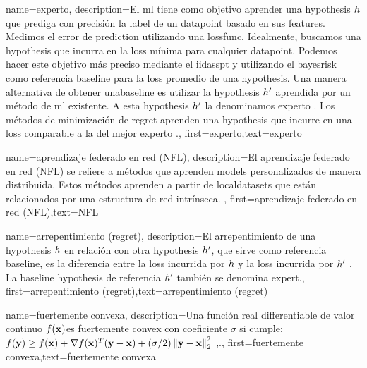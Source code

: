 {name={experto},
	description={El \gls{ml} tiene como objetivo aprender una \gls{hypothesis} $h$ que prediga con precisión la \gls{label} 
		de un \gls{datapoint} basado en sus \gls{feature}s. Medimos el error de \gls{prediction} utilizando una
		\gls{lossfunc}. Idealmente, buscamos una \gls{hypothesis} que incurra en la \gls{loss} mínima
		para cualquier \gls{datapoint}. Podemos hacer este objetivo más preciso mediante el \gls{iidasspt} 
		y utilizando el \gls{bayesrisk} como referencia \gls{baseline} para la \gls{loss} promedio de una \gls{hypothesis}. 
		Una manera alternativa de obtener una\gls{baseline} es utilizar la \gls{hypothesis} $h'$ aprendida 
		por un método de \gls{ml} existente. A esta \gls{hypothesis} $h'$ la denominamos experto \cite{PredictionLearningGames}. Los métodos de minimización de \Gls{regret} aprenden una \gls{hypothesis}
		que incurre en una \gls{loss} comparable a la del mejor experto \cite{PredictionLearningGames,HazanOCO}.},
	first={experto},text={experto} 
}

{name={aprendizaje federado en red (NFL)},
	description={El aprendizaje federado en red (NFL) se refiere 
		a métodos que aprenden \gls{model}s personalizados de manera distribuida. Estos métodos aprenden a partir de \gls{localdataset}s 
		que están relacionados por una estructura de red intrínseca.
		},
 first={aprendizaje federado en red (NFL)},text={NFL} 
}




{name={arrepentimiento (regret)},
	description={El arrepentimiento de una \gls{hypothesis} $h$ en relación con otra 
		\gls{hypothesis} $h'$, que sirve como referencia \gls{baseline}, 
		es la diferencia entre la \gls{loss} incurrida por $h$ y la \gls{loss} 
		incurrida por $h'$ \cite{PredictionLearningGames}. 
		La \gls{baseline} \gls{hypothesis} de referencia $h'$ también se denomina \gls{expert}.},
	first={arrepentimiento (regret)},text={arrepentimiento (regret)} 
}

{name={fuertemente convexa},
	description={Una función real \gls{differentiable} de valor continuo 
		 $f({\bf x})$es fuertemente \gls{convex} con coeficiente $\sigma$ si cumple: $f({\bf y}) \geq f({\bf x}) + \nabla f({\bf x})^{T} ({\bf y} - {\bf x}) + (\sigma/2) \left\Vert {{\bf y}- {\bf x}} \right\Vert_{2}^{2}$ \cite{nesterov04},\cite[Sec. B.1.1]{CvxAlgBertsekas}.},
	first={fuertemente convexa},text={fuertemente convexa} 
}

